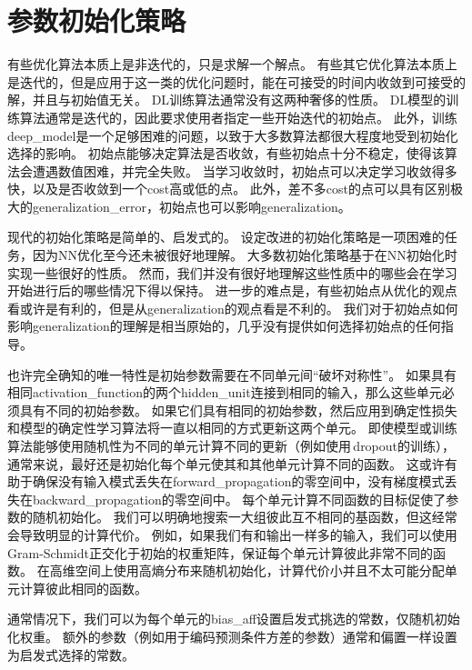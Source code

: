 \section{参数初始化策略}
\label{sec:parameter_initialization_strategies}
有些优化算法本质上是非迭代的，只是求解一个解点。
有些其它优化算法本质上是迭代的，但是应用于这一类的优化问题时，能在可接受的时间内收敛到可接受的解，并且与初始值无关。
\gls{DL}训练算法通常没有这两种奢侈的性质。
\gls{DL}模型的训练算法通常是迭代的，因此要求使用者指定一些开始迭代的初始点。
此外，训练\gls{deep_model}是一个足够困难的问题，以致于大多数算法都很大程度地受到初始化选择的影响。
初始点能够决定算法是否收敛，有些初始点十分不稳定，使得该算法会遭遇数值困难，并完全失败。
当学习收敛时，初始点可以决定学习收敛得多快，以及是否收敛到一个\gls{cost}高或低的点。
此外，差不多\gls{cost}的点可以具有区别极大的\gls{generalization_error}，初始点也可以影响\gls{generalization}。


现代的初始化策略是简单的、启发式的。
设定改进的初始化策略是一项困难的任务，因为\gls{NN}优化至今还未被很好地理解。
大多数初始化策略基于在\gls{NN}初始化时实现一些很好的性质。
然而，我们并没有很好地理解这些性质中的哪些会在学习开始进行后的哪些情况下得以保持。
进一步的难点是，有些初始点从优化的观点看或许是有利的，但是从\gls{generalization}的观点看是不利的。
我们对于初始点如何影响\gls{generalization}的理解是相当原始的，几乎没有提供如何选择初始点的任何指导。


也许完全确知的唯一特性是初始参数需要在不同单元间``破坏对称性''。
如果具有相同\gls{activation_function}的两个\gls{hidden_unit}连接到相同的输入，那么这些单元必须具有不同的初始参数。
如果它们具有相同的初始参数，然后应用到确定性损失和模型的确定性学习算法将一直以相同的方式更新这两个单元。
即使模型或训练算法能够使用随机性为不同的单元计算不同的更新（例如使用\,\gls{dropout}的训练），通常来说，最好还是初始化每个单元使其和其他单元计算不同的函数。
这或许有助于确保没有输入模式丢失在\gls{forward_propagation}的零空间中，没有梯度模式丢失在\gls{backward_propagation}的零空间中。
每个单元计算不同函数的目标促使了参数的随机初始化。
我们可以明确地搜索一大组彼此互不相同的基函数，但这经常会导致明显的计算代价。  
例如，如果我们有和输出一样多的输入，我们可以使用Gram-Schmidt正交化于初始的权重矩阵，保证每个单元计算彼此非常不同的函数。
在高维空间上使用高熵分布来随机初始化，计算代价小并且不太可能分配单元计算彼此相同的函数。


通常情况下，我们可以为每个单元的\gls{bias_aff}设置启发式挑选的常数，仅随机初始化权重。
额外的参数（例如用于编码预测条件方差的参数）通常和偏置一样设置为启发式选择的常数。


